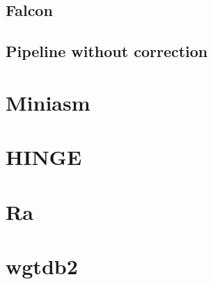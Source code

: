\documentclass[main.tex]{subfiles}
\begin{document}
\subsection{Falcon}

\subsection{Pipeline without correction}

\section{Miniasm}

\section{HINGE}

\section{Ra}

\section{wgtdb2}
\end{document}
